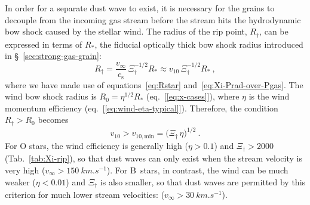 \message{ !name(dusty-bow-wave.tex)}\documentclass[useAMS, usenatbib, a4paper]{mnras}
\newcommand\sound{\ensuremath{c_{\text{s}}}}
\begin{document}
In order for a separate dust wave to exist, it is necessary for the
grains to decouple from the incoming gas stream before the stream hits
the hydrodynamic bow shock caused by the stellar wind.  The radius of
the rip point, \(R_\dag\), can be expressed in terms of \(R_*\), the
fiducial optically thick bow shock radius introduced in
\S~\ref{sec:strong-gas-grain}:
\begin{equation}
  \label{eq:Rdag-over-Rstar}
  R_\dag = \frac{v_\infty}{\sound}\, \Xi_\dag^{-1/2} R_* \approx v_{10}\, \Xi_\dag^{-1/2} R_* \ ,
\end{equation}
where we have made use of equations~\eqref{eq:Rstar}
and~\eqref{eq:Xi-Prad-over-Pgas}.  The wind bow shock radius is
\(R_0 = \eta^{1/2} R_*\) (eq.~[\ref{eq:x-cases}]), where \(\eta\) is the
wind momentum efficiency (eq.~[\ref{eq:wind-eta-typical}]).
Therefore, the condition \(R_\dag > R_0\) becomes
\begin{equation}
  \label{eq:dust-wave-velocity-condition}
  v_{10} > v_{10,\text{min}} = \bigl( \Xi_\dag \, \eta \bigr)^{1/2} \ . 
\end{equation}
For O stars, the wind efficiency is generally high (\(\eta > 0.1\)) and
\(\Xi_\dag > 2000\) (Tab.~\ref{tab:Xi-rip}), so that dust waves can only
exist when the stream velocity is very high
(\(v_\infty > \SI{150}{km.s^{-1}}\)).  For B~stars, in contrast, the wind
can be much weaker (\(\eta < 0.01\)) and \(\Xi_\dag\) is also smaller, so
that dust waves are permitted by this criterion for much lower stream
velocities: (\(v_\infty > \SI{30}{km.s^{-1}}\)).
\end{document}
